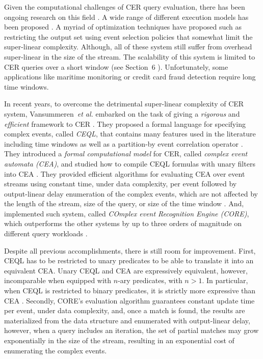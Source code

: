 Given the computational challenges of CER query evaluation, there has been ongoing research on this field \cite{research-evaluation-query, formal-framework-cer}. A wide range of different execution models has been proposed \cite{survey-systems-1, survey-systems-2}. A myriad of optimization techniques have proposed such as restricting the output set using event selection policies \cite{skip-till-any-match} that somewhat limit the super-linear complexity. Although, all of these system still suffer from overhead super-linear in the size of the stream. The scalability of this system is limited to CER queries over a short window (see Section~6 \cite{core}). Unfortunately, some applications like maritime monitoring \cite{maritime-monitoring} or credit card fraud detection \cite{fraud-detection} require long time windows.

In recent years, to overcome the detrimental super-linear complexity of CER system, Vansummeren~\textit{et al.} embarked on the task of giving a \emph{rigorous} and \emph{efficient} framework to CER \cite{formal-framework-cep, formal-framework-cer}. They proposed a formal language for specifying complex events, called \emph{CEQL}, that contains many features used in the literature including time windows as well as a partition-by event correlation operator \cite{on-the-expressiveness, core}. They introduced a \emph{formal computational model} for CER, called \emph{complex event automata (CEA)}, and studied how to compile CEQL formulas with unary filters into CEA \cite{formal-framework-cer}. They provided efficient algorithms for evaluating CEA over event streams using constant time, under data complexity, per event followed by output-linear delay enumeration of the complex events, which are not affected by the length of the stream, size of the query, or size of the time window \cite{formal-framework-cer, core}. And, implemented such system, called \emph{COmplex event Recognition Engine (CORE)}, which outperforms the other systems by up to three orders of magnitude on different query workloads \cite{core}.

Despite all previous accomplishments, there is still room for improvement. First, CEQL has to be restricted to unary predicates to be able to translate it into an equivalent CEA. Unary CEQL and CEA are expressively equivalent, however, incomparable when equipped with $n$-ary predicates, with $n > 1$. In particular, when CEQL is restricted to binary predicates, it is strictly more expressive than CEA \cite{on-the-expressiveness}. Secondly, CORE's evaluation algorithm guarantees constant update time per event, under data complexity, and, once a match is found, the results are materialized from the data structure and enumerated with output-linear delay, however, when a query includes an iteration, the set of partial matches may grow exponentially in the size of the stream, resulting in an exponential cost of enumerating the complex events.

